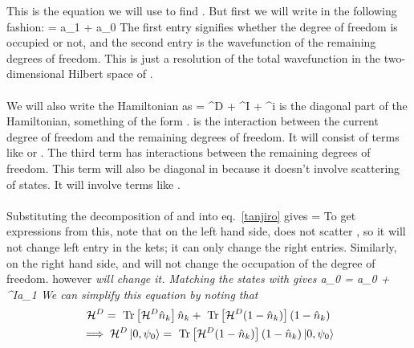 \documentclass[14pt]{extarticle}
\numberwithin{equation}{section}
\begin{document}
\eeq
This is the equation we will use to find . But first we will write \il{\psi} in the following fashion:
\beq
\ket{\psi} = a_1  + a_0
\eeq
The first entry signifies whether the degree of freedom  is occupied or not, and the second entry is the wavefunction of the remaining degrees of freedom. This is just a resolution of the total wavefunction in the two-dimensional Hilbert space of .\\\\
We will also write the Hamiltonian \il{\ham} as
\beq[ham]
\ham = \ham^D + \ham^I + \ham^i 
\eeq
{} is the diagonal part of the Hamiltonian, something of the form .  is the interaction between the current degree of freedom  and the remaining degrees of freedom. It will consist of terms like  or . The third term  has interactions between the remaining degrees of freedom. This term will also be diagonal in  because it doesn't involve scattering of  states. It will involve terms like . \\\\
Substituting the decomposition of \il{\ket{\psi}} and \ham into eq.~\ref{tanjiro} gives
\beq[zenitsu]
\ol \ham {} = 
\eeq
To get expressions from this, note that on the left hand side, \il{\ol \ham} does not scatter , so it will not change left entry in the kets; it can only change the right entries. Similarly, on the right hand side,  and  will not change the occupation of the  degree of freedom.  however \it{will} change it. Matching the states with  gives
\beq
\ol \ham a_0 = a_0 + \ham^Ia_1
\eeq
We can simplify this equation by noting that
\begin{gather}
\mathcal{H}^D = \text{ Tr} \left[{\mathcal{H}^D \hat n_k}\right]\hat n_k + \text{ Tr} \left[{\mathcal{H}^D (1 - \hat n_k)}\right](1-\hat n_k)\\
 \implies  \mathcal{H}^D \ket{0,\psi_0} = \text{ Tr} \left[{\mathcal{H}^D (1 - \hat n_k)}\right](1-\hat n_k)\ket{0,\psi_0}
\end{gather}
\end{document}
